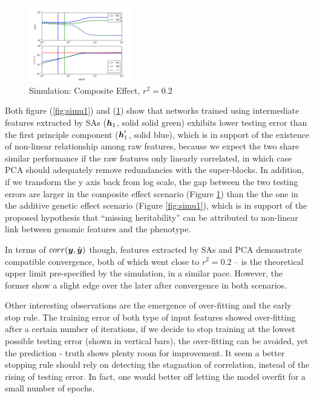 \documentclass[acmtog, authorversion]{acmart}
\begin{document}
\begin{figure}[h]
  \centering
  \includegraphics[width=0.4\textwidth]{img/cmp_gsu}
  \caption{Simulation: Composite Effect, $r^2 = 0.2$ }
  \label{fig:simu2}
\end{figure}
Both figure (\ref{fig:simu1}) and (\ref{fig:simu2}) show that networks trained using intermediate features extracted by SAs ($\boldsymbol{h}_1$, solid solid green) exhibits lower testing error than the first principle component ($\boldsymbol{h}_1^\prime$, solid blue), which is in support of the existence of non-linear relationship among raw features, because we expect the two share similar performance if the raw features only linearly correlated, in which case PCA should adequately remove redundancies with the super-blocks. In addition, if we transform the y axis back from log scale, the gap between the two testing errors are larger in the composite effect scenario (Figure \ref{fig:simu2}) than the the one in the additive genetic effect scenario (Figure \ref{fig:simu1}), which is in support of the proposed hypothesis that ``missing heritability'' can be attributed to non-linear link between genomic features and the phenotype.

In terms of $corr(\boldsymbol{y}, \hat{\boldsymbol{y}})$ though, features extracted by SAs and PCA demonstrate compatible convergence, both of which went close to $r^2 = 0.2$ -- is the theoretical upper limit pre-specified by the simulation, in a similar pace. However, the former show a slight edge over the later after convergence in both scenarios.

Other interesting observations are the emergence of over-fitting and the early stop rule. The training error of both type of input features showed over-fitting after a certain number of iterations, if we decide to stop training at the lowest possible testing error (shown in vertical bars), the over-fitting can be avoided, yet the prediction - truth shows plenty room for improvement. It seem a better stopping rule should rely on detecting the stagnation of correlation, instead of the rising of testing error. In fact, one would better off letting the model overfit for a small number of epochs.
\end{document}
